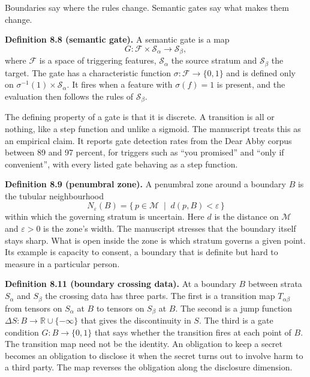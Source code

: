 Boundaries say where the rules change. Semantic gates say what makes them change.

\medskip\noindent\textbf{Definition 8.8 (semantic gate).} A semantic gate is a map
\begin{equation}
G\colon \mathcal{F}\times\mathcal{S}_\alpha \to \mathcal{S}_\beta ,
\label{eq:ge-gate}
\end{equation}
where $\mathcal{F}$ is a space of triggering features, $\mathcal{S}_\alpha$ the source stratum and
$\mathcal{S}_\beta$ the target. The gate has a characteristic function
$\sigma\colon\mathcal{F}\to\{0,1\}$ and is defined only on $\sigma^{-1}(1)\times\mathcal{S}_\alpha$.
It fires when a feature with $\sigma(f)=1$ is present, and the evaluation then follows the rules
of $\mathcal{S}_\beta$.

The defining property of a gate is that it is discrete. A transition is all or nothing, like a
step function and unlike a sigmoid. The manuscript treats this as an empirical claim. It reports
gate detection rates from the Dear Abby corpus between 89 and 97 percent, for triggers such as
``you promised'' and ``only if convenient'', with every listed gate behaving as a step function.

\medskip\noindent\textbf{Definition 8.9 (penumbral zone).} A penumbral zone around a boundary $B$
is the tubular neighbourhood
\begin{equation}
N_\varepsilon(B) = \{\, p\in\mathcal{M} \;\mid\; d(p,B) < \varepsilon \,\}
\label{eq:ge-penumbra}
\end{equation}
within which the governing stratum is uncertain. Here $d$ is the distance on $\mathcal{M}$ and
$\varepsilon>0$ is the zone's width.
The manuscript stresses that the boundary itself stays sharp. What is open inside the zone is
which stratum governs a given point. Its example is capacity to consent, a boundary that is
definite but hard to measure in a particular person.

\medskip\noindent\textbf{Definition 8.11 (boundary crossing data).} At a boundary $B$ between strata
$S_\alpha$ and $S_\beta$ the crossing data has three parts. The first is a transition map
$T_{\alpha\beta}$ from tensors on $S_\alpha$ at $B$ to tensors on $S_\beta$ at $B$. The second is
a jump function $\Delta S\colon B\to\mathbb{R}\cup\{-\infty\}$ that gives the discontinuity in
$S$. The third is a gate condition $G\colon B\to\{0,1\}$ that says whether the transition fires at
each point of $B$.
The transition map need not be the identity. An obligation to keep a secret becomes an obligation
to disclose it when the secret turns out to involve harm to a third party. The map reverses the
obligation along the disclosure dimension.

